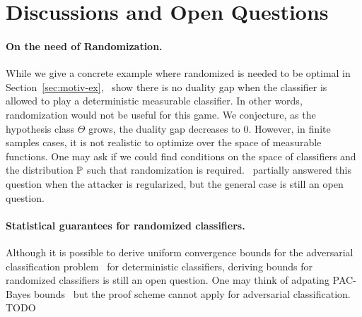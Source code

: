 \section{Discussions and Open Questions}


\paragraph{On the need of Randomization.} While we give a concrete example where randomized is needed to be optimal in Section~\ref{sec:motiv-ex},~\citep{pydi2021many} show there is no duality gap when the classifier is allowed to play a deterministic measurable classifier. In other words, randomization would not be useful for this game. We conjecture, as the hypothesis class $\Theta$ grows, the duality gap decreases to $0$. However, in finite samples cases, it is not realistic to optimize over the space of measurable functions. One may ask if we could find conditions on the space of classifiers and the distribution $\mathbb{P}$ such that randomization is required.~\citet{pinot2020randomization} partially answered this question when the attacker is regularized, but the general case is still an open question.

\paragraph{Statistical guarantees for randomized classifiers.} Although it is possible to derive uniform convergence bounds for the adversarial classification problem~\citep{yin2019rademacher,awasthi2020adversarial} for deterministic classifiers, deriving bounds for randomized classifiers is still an open question. One may think of adpating PAC-Bayes bounds~\citep{xxx} but the proof scheme cannot apply for adversarial classification. TODO


